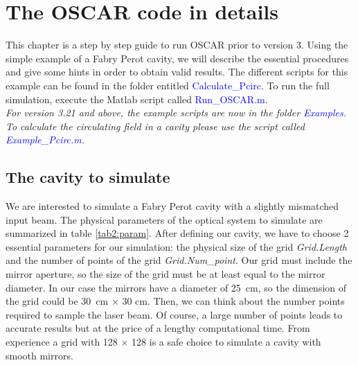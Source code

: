 \chapter{The OSCAR code in details}
\label{chap2}
This chapter is a step by step guide to run OSCAR prior to version 3. Using the simple example of a Fabry Perot cavity, we will describe the essential procedures and give some hints in order to obtain valid results. The different scripts for this example can be found in the folder entitled \textcolor{blue}{Calculate\_Pcirc}. To run the full simulation, execute the Matlab script called \textcolor{blue}{Run\_OSCAR.m}.\\

\emph{For version 3.21 and above, the example scripts are now in the folder \textcolor{blue}{Examples}. To calculate the circulating field in a cavity please use the script called \textcolor{blue}{Example\_Pcirc.m}.}

\section{The cavity to simulate}
\label{chap2:1}
We are interested to simulate a Fabry Perot cavity with a slightly mismatched input beam. The physical parameters of the optical system to simulate are summarized in table \ref{tab2:param}. After defining our cavity, we have to choose 2 essential parameters for our simulation: the physical size of the grid \textsl{Grid.Length} and the number of points of the grid \textsl{Grid.Num\_point}. Our grid must include the mirror aperture, so the size of the grid must be at least equal to the mirror diameter. In our case the mirrors have a diameter of 25~cm, so the dimension of the grid could be 30~cm $\times$ 30 cm. Then, we can think about the number points required to sample the laser beam. Of course, a large number of points leads to accurate results but at the price of a lengthy computational time. From experience a grid with 128 $\times$ 128 is a safe choice to simulate a cavity with smooth mirrors.

